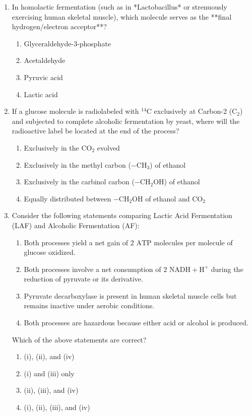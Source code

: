 \documentclass[11pt, a4paper]{article}
\begin{document}
\begin{enumerate}[label=\textbf{\arabic*.}]
\item In homolactic fermentation (such as in *Lactobacillus* or strenuously exercising human skeletal muscle), which molecule serves as the **final hydrogen/electron acceptor**?
\begin{enumerate}[label=(\Alph*)]
    \item Glyceraldehyde-3-phosphate
    \item Acetaldehyde
    \item Pyruvic acid
    \item Lactic acid
\end{enumerate}

\item If a glucose molecule is radiolabeled with $^{14}\text{C}$ exclusively at Carbon-2 ($\text{C}_2$) and subjected to complete alcoholic fermentation by yeast, where will the radioactive label be located at the end of the process?
\begin{enumerate}[label=(\Alph*)]
    \item Exclusively in the $\text{CO}_2$ evolved
    \item Exclusively in the methyl carbon ($-\text{CH}_3$) of ethanol
    \item Exclusively in the carbinol carbon ($-\text{CH}_2\text{OH}$) of ethanol
    \item Equally distributed between $-\text{CH}_2\text{OH}$ of ethanol and $\text{CO}_2$
\end{enumerate}

\item Consider the following statements comparing Lactic Acid Fermentation (LAF) and Alcoholic Fermentation (AF):
\begin{enumerate}[label=(\roman*)]
    \item Both processes yield a net gain of $2\text{ ATP}$ molecules per molecule of glucose oxidized.
    \item Both processes involve a net consumption of $2\text{ NADH} + \text{H}^+$ during the reduction of pyruvate or its derivative.
    \item Pyruvate decarboxylase is present in human skeletal muscle cells but remains inactive under aerobic conditions.
    \item Both processes are hazardous because either acid or alcohol is produced.
\end{enumerate}
Which of the above statements are correct?
\begin{enumerate}[label=(\Alph*)]
    \item (i), (ii), and (iv)
    \item (i) and (iii) only
    \item (ii), (iii), and (iv)
    \item (i), (ii), (iii), and (iv)
\end{enumerate}


\end{enumerate}
\end{document}

